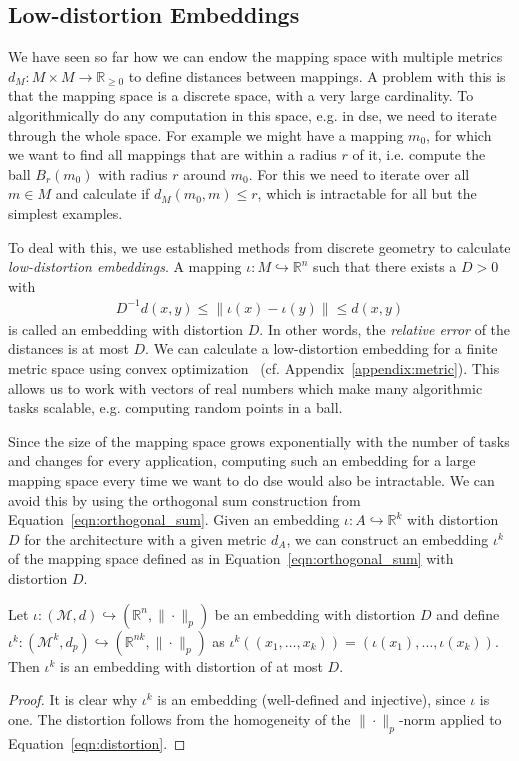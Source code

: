 \subsection{Low-distortion Embeddings}

We have seen so far how we can endow the mapping space with multiple metrics $d_M : M \times M \rightarrow \mathbb{R}_{\geq 0}$ to define distances between mappings.
A problem with this is that the mapping space is a discrete space, with a very large cardinality.
To algorithmically do any computation in this space, e.g. in \ac{dse}, we need to iterate through the whole space.
For example we might have a mapping $m_0$, for which we want to find all mappings that are within a radius $r$ of it, i.e. compute the ball $B_r(m_0)$ with radius $r$ around $m_0$.
For this we need to iterate over all $m \in M$ and calculate if $d_M(m_0,m) \leq r$, which is intractable for all but the simplest examples.

To deal with this, we use established methods from discrete geometry to calculate \emph{low-distortion embeddings}.
A mapping $\iota : M \hookrightarrow \mathbb{R}^n$ such that there exists a $D > 0$ with
\begin{align}\label{eqn:distortion} D^{-1} d(x,y) \leq \| \iota(x) - \iota(y) \| \leq d(x,y) \end{align}
is called an embedding with distortion $D$.
In other words, the \emph{relative error} of the distances is at most $D$.
We can calculate a low-distortion embedding for a finite metric space using convex optimization~\cite{matouvsek} (cf. Appendix~\ref{appendix:metric}).
This allows us to work with vectors of real numbers which make many algorithmic tasks scalable, e.g. computing random points in a ball.

Since the size of the mapping space grows exponentially with the number of tasks and changes for every application, computing such an embedding for a large mapping space every time we want to do \ac{dse} would also be intractable.
We can avoid this by using the orthogonal sum construction from Equation~\ref{eqn:orthogonal_sum}.
Given an embedding $\iota : A \hookrightarrow \mathbb{R}^k$ with distortion $D$ for the architecture with a given metric $d_A$, we can construct an embedding $\iota^k$ of the mapping space defined as in Equation~\ref{eqn:orthogonal_sum} with distortion $D$.
\begin{theorem}
\label{thm:iotad}
Let $\iota: (\mathcal{M}, d) \hookrightarrow (\mathbb{R}^n, \| \cdot \|_p)$ be an embedding with distortion $D$ and define $\iota^{k} : (\mathcal{M}^k,d_p) \hookrightarrow (\mathbb{R}^{nk}, \| \cdot \|_p)$ as
$\iota^k ( (x_1,\ldots,x_k)) = (\iota(x_1),\ldots,\iota(x_k))$. Then $\iota^k$ is an embedding with distortion of at most $D$.
\begin{proof}
It is clear why $\iota^k$ is an embedding (well-defined and injective), since $\iota$ is one.
The distortion follows from the homogeneity of the $\| \cdot \|_p$-norm applied to Equation~\ref{eqn:distortion}.
\end{proof}
\end{theorem}
	  
